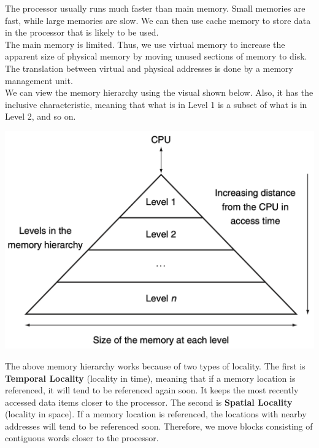 \begin{minipage}{0.5\textwidth}
  The processor usually runs much faster than main memory. Small memories are fast, while large memories are slow. We can then use cache memory to store data in the processor that is likely to be used. \\[5pt]
  The main memory is limited. Thus, we use virtual memory to increase the apparent size of physical memory by moving unused sections of memory to disk. The translation between virtual and physical addresses is done by a memory management unit. \\[5pt]
  We can view the memory hierarchy using the visual shown below. Also, it has the inclusive characteristic, meaning that what is in Level 1 is a subset of what is in Level 2, and so on.
\end{minipage}
\begin{minipage}{0.5\textwidth}
  \begin{center}
  \includegraphics[width=\textwidth]{Figure/memory_struct.png}
\end{center}
\end{minipage}

The above memory hierarchy works because of two types of locality. The first is \textbf{Temporal Locality} (locality in time), meaning that if a memory location is referenced, it will tend to be referenced again soon. It keeps the most recently accessed data items closer to the processor. The second is \textbf{Spatial Locality} (locality in space). If a memory location is referenced, the locations with nearby addresses will tend to be referenced soon. Therefore, we move blocks consisting of contiguous words closer to the processor.

